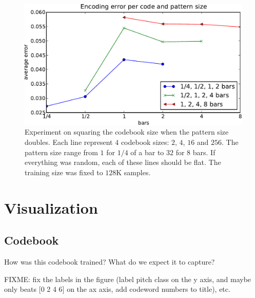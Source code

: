 \documentclass{article}
\begin{document}
\begin{figure}[htb]
\begin{center}
\includegraphics[width=.99\columnwidth]{codesize_patternsize}
\end{center}
\caption{\small{
Experiment on squaring the codebook size when the pattern size doubles.
Each line represent $4$ codebook sizes: $2$, $4$, $16$ and $256$.
The pattern size range from $1$ for $1/4$ of a bar to $32$ for $8$ bars.
If everything was random, each of these lines should be flat. The training
size was fixed to $128$K samples.
}}
\label{fig:size_pattern}
\end{figure}
\fi


\section{Visualization} \label{sec:visu}


\subsection{Codebook}\label{sec:codebook}

How was this codebook trained?
What do we expect it to capture?

FIXME: fix the labels in the figure (label pitch class on the y axis,
and maybe only beats [0 2 4 6] on the ax axis, add codeword numbers to
title), etc.
\end{document}
